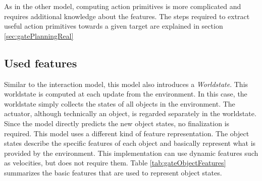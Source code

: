 As in the other model, computing action primitives is more complicated and requires additional knowledge about the features. The steps required to extract useful action primitives towards a given target are explained in section \ref{sec:gatePlanningReal}


%
%
%


\subsection{Used features \label{sec:gateFeatures}}

Similar to the interaction model, this model also introduces a \textit{Worldstate}. This worldstate is computed at each update from the environment. In this case, the worldstate simply collects the states of all objects in the environment. The actuator, although technically an object, is regarded separately in the worldstate. Since the model directly predicts the new object states, no finalization is required. 
This model uses a different kind of feature representation. The object states describe the specific features of each object and basically represent what is provided by the environment. This implementation can use dynamic features such as velocities, but does not require them. Table \ref{tab:gateObjectFeatures} summarizes the basic features that are used to represent object states.

